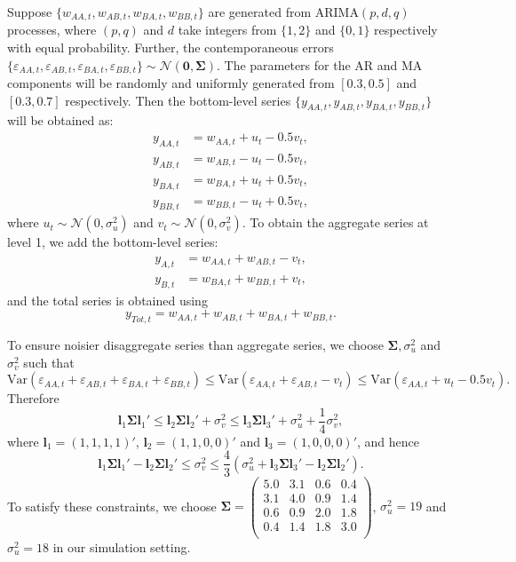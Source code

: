 \documentclass[a4paper, 11pt]{article}
\theoremstyle{theo}
\theoremstyle{definition}
\begin{document}
Suppose $\{w_{AA,t},w_{AB,t},w_{BA,t},w_{BB,t}\}$ are generated from ARIMA$(p,d,q)$ processes, where $(p,q)$ and $d$ take integers from $\{1,2\}$ and $\{0,1\}$ respectively with equal probability. Further, the contemporaneous errors $\{\varepsilon_{AA,t},\varepsilon_{AB,t},\varepsilon_{BA,t},\varepsilon_{BB,t}\} \sim \mathcal{N}(\bm{0}, \bm{\Sigma})$. The parameters for the AR and MA components will be randomly and uniformly generated from $[0.3,0.5]$ and $[0.3,0.7]$ respectively. Then the bottom-level series $\{y_{AA,t},y_{AB,t},y_{BA,t},y_{BB,t}\}$ will be obtained as:
\begin{align*}
y_{AA,t} &= w_{AA,t} + u_t - 0.5v_t,\\
y_{AB,t} &= w_{AB,t} - u_t - 0.5v_t,\\
y_{BA,t} &= w_{BA,t} + u_t + 0.5v_t,\\
y_{BB,t} &= w_{BB,t} - u_t + 0.5v_t,
\end{align*}
where $u_t \sim \mathcal{N}(0,\sigma^2_u)$ and $v_t \sim \mathcal{N}(0,\sigma^2_v)$.
To obtain the aggregate series at level 1, we add the bottom-level series:
\begin{align*}
y_{A,t} &= w_{AA,t} + w_{AB,t} - v_t,\\
y_{B,t} &= w_{BA,t} + w_{BB,t} + v_t,
\end{align*}
and the total series is obtained using
$$y_{Tot,t} = w_{AA,t} + w_{AB,t} + w_{BA,t} + w_{BB,t}.$$

To ensure noisier disaggregate series than aggregate series, we choose $\bm{\Sigma}, \sigma^2_u$ and $\sigma^2_v$ such that
$$
\text{Var}(\varepsilon_{AA,t}+\varepsilon_{AB,t}+\varepsilon_{BA,t}+\varepsilon_{BB,t}) \le \text{Var}(\varepsilon_{AA,t}+\varepsilon_{AB,t}-v_t) \le \text{Var}(\varepsilon_{AA,t}+u_t-0.5v_t).
$$
Therefore
$$
\bm{l}_1\bm{\Sigma} \bm{l}_1' \le \bm{l}_2\bm{\Sigma} \bm{l}_2' + \sigma^2_v \le  \bm{l}_3\bm{\Sigma} \bm{l}_3' + \sigma^2_u + \frac{1}{4}\sigma^2_v,
$$
where $\bm{l}_1 = (1,1,1,1)'$, $\bm{l}_2 = (1,1,0,0)'$ and $\bm{l}_3 = (1,0,0,0)'$, and hence
$$\bm{l}_1\bm{\Sigma} \bm{l}_1' - \bm{l}_2\bm{\Sigma} \bm{l}_2' \le \sigma^2_v \le \frac{4}{3}(\sigma^2_u + \bm{l}_3\bm{\Sigma} \bm{l}_3' - \bm{l}_2\bm{\Sigma} \bm{l}_2').$$
To satisfy these constraints, we choose
$\bm{\Sigma} =
\begin{pmatrix}
5.0 & 3.1 & 0.6 & 0.4 \\
3.1 & 4.0 & 0.9 & 1.4 \\
0.6 & 0.9 & 2.0 & 1.8 \\
0.4 & 1.4 & 1.8 & 3.0 \\
\end{pmatrix}$,
$\sigma^2_u = 19$ and $\sigma^2_u = 18$ in our simulation setting.
\end{document}

